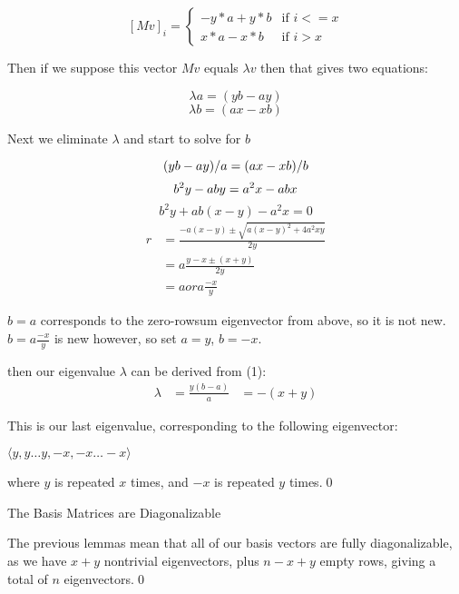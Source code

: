 \documentclass[10pt,a4paper]{report}
\begin{document}
\[ {[Mv]}_i = \begin{cases}
	-y*a + y*b & \text{if } i <= x\\
	x*a - x*b & \text{if } i > x
\end{cases} \]

Then if we suppose this vector $Mv$ equals $\lambda v$ then that gives two
equations:

\begin{equation}
	\lambda a = (yb - ay)
\end{equation}
\begin{equation*}
	\lambda b = (ax - xb)
\end{equation*}

Next we eliminate $\lambda$ and start to solve for $b$

\begin{equation*}
	(yb - ay)/a = (ax - xb)/b\\
\end{equation*}
\begin{equation*}
	b^2y - aby = a^2x - abx\\
\end{equation*}
\begin{equation*}
	b^2y + ab(x - y) - a^2x = 0
\end{equation*}
\begin{align*}
	r &= \frac{-a(x-y) \pm \sqrt{{a(x-y)}^2 + 4a^2xy}}{2y}\\
	  &= a\frac{y - x \pm (x + y)}{2y}\\
	  &= a or a\frac{-x}{y}
\end{align*}

$b = a$ corresponds to the zero-rowsum eigenvector from above, so it is not
new.
$b = a\frac{-x}{y}$ is new however, so set $a = y$, $b = -x$.

then our eigenvalue $\lambda$ can be derived from (1):
\begin{align*}
	\lambda &= \frac{y(b - a)}{a}
			&= -(x + y)
\end{align*}

This is our last eigenvalue, corresponding to the following eigenvector:

$\langle y, y\ldots y, -x, -x\ldots -x\rangle$

where $y$ is repeated $x$ times, and $-x$ is repeated $y$ times.\qed

\begin{theorem} The Basis Matrices are Diagonalizable \end{theorem}

The previous lemmas mean that all of our basis vectors are fully
diagonalizable, as we have $x+y$ nontrivial eigenvectors, plus $n-x+y$ empty
rows, giving a total of $n$ eigenvectors.\qed
\end{document}
